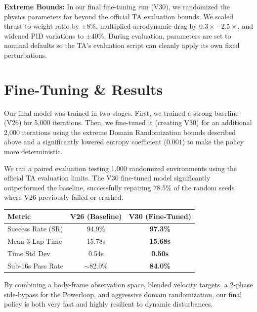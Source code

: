 \documentclass[10pt, twocolumn]{article}
\begin{document}
\textbf{Extreme Bounds:} In our final fine-tuning run (V30), we randomized the physics parameters far beyond the official TA evaluation bounds. We scaled thrust-to-weight ratio by $\pm8\%$, multiplied aerodynamic drag by $0.3\times - 2.5\times$, and widened PID variations to $\pm40\%$. During evaluation, parameters are set to nominal defaults so the TA's evaluation script can cleanly apply its own fixed perturbations.

\section{Fine-Tuning \& Results}
Our final model was trained in two stages. First, we trained a strong baseline (V26) for 5,000 iterations. Then, we fine-tuned it (creating V30) for an additional 2,000 iterations using the extreme Domain Randomization bounds described above and a significantly lowered entropy coefficient ($0.001$) to make the policy more deterministic.

We ran a paired evaluation testing 1,000 randomized environments using the official TA evaluation limits. The V30 fine-tuned model significantly outperformed the baseline, successfully repairing 78.5\% of the random seeds where V26 previously failed or crashed.

\begin{table}[ht!]
\centering
\small
\begin{tabular}{@{}l c c@{}}
\toprule
\textbf{Metric} & \textbf{V26 (Baseline)} & \textbf{V30 (Fine-Tuned)} \\
\midrule
Success Rate (SR) & 94.9\% & \textbf{97.3\%} \\
Mean 3-Lap Time & 15.78s & \textbf{15.68s} \\
Time Std Dev & 0.54s & \textbf{0.50s} \\
Sub-16s Pass Rate & $\sim$82.0\% & \textbf{84.0\%} \\
\bottomrule
\end{tabular}
\end{table}

By combining a body-frame observation space, blended velocity targets, a 2-phase side-bypass for the Powerloop, and aggressive domain randomization, our final policy is both very fast and highly resilient to dynamic disturbances.
\end{document}
